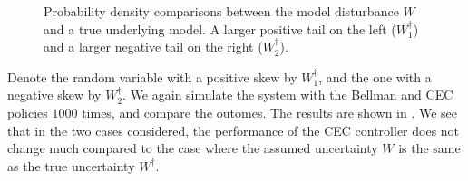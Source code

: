 \documentclass[main.tex]{subfiles}
\begin{document}
\begin{figure}[htbp]
  \centering
  \begin{subfigure}[b]{0.5\textwidth}
    \centering
  \end{subfigure}%
  \begin{subfigure}[b]{0.5\textwidth}
    \centering
  \end{subfigure}
  \caption{Probability density comparisons between
    the model disturbance $W$ and a true underlying
    model. A larger positive tail on the left ($W_1^\dagger$) and
    a larger negative tail on the right ($W_2^\dagger$).
  }\label{fig:chisq_transformed}
\end{figure}
Denote the random variable with a positive skew by $W_1^\dagger$, and
the one with a negative skew by $W_2^\dagger$.
We again simulate the system with the Bellman and CEC policies $1000$
times, and compare the outomes. The results are shown in
. We see that in the two cases considered,
the performance of the CEC controller does not change much
compared to the case where the assumed uncertainty $W$ is the same as
the true uncertainty $W^\dagger$.
\end{document}
